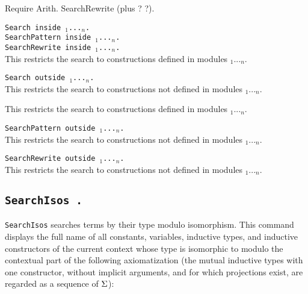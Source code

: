 \begin{coq_example}
Require Arith.
SearchRewrite (plus ? ?).
\end{coq_example}

\begin{Variants}
\item
 {\tt Search {\qualid} inside
{\module$_1$}...{\module$_n$}.}\\
{\tt SearchPattern {\term} inside
{\module$_1$}...{\module$_n$}.}\\
{\tt SearchRewrite {\term} inside
{\module$_1$}...{\module$_n$}.}\\
This restricts the search to constructions defined in modules {\module$_1$}...{\module$_n$}.

\item {\tt Search {\qualid} outside {\module$_1$}...{\module$_n$}.}\\
  This restricts the search to constructions not defined in modules {\module$_1$}...{\module$_n$}.


  This restricts the search to constructions defined in modules {\module$_1$}...{\module$_n$}.

\item {\tt SearchPattern {\term} outside {\module$_1$}...{\module$_n$}.}\\
  This restricts the search to constructions not defined in modules
{\module$_1$}...{\module$_n$}.

\item {\tt SearchRewrite {\term} outside {\module$_1$}...{\module$_n$}.}\\
  This restricts the search to constructions not defined in modules
{\module$_1$}...{\module$_n$}.

\end{Variants}

\subsection{\tt SearchIsos {\term}.}
\label{searchisos}
\texttt{SearchIsos} searches terms by their type modulo isomorphism.
This command displays the full name of all constants, variables,
inductive types, and inductive constructors of the current
context whose type is isomorphic to {\term} modulo the contextual part of the
following axiomatization (the mutual inductive types with one constructor,
without implicit arguments, and for which projections exist, are regarded as a
sequence of $\Sigma{}$):


